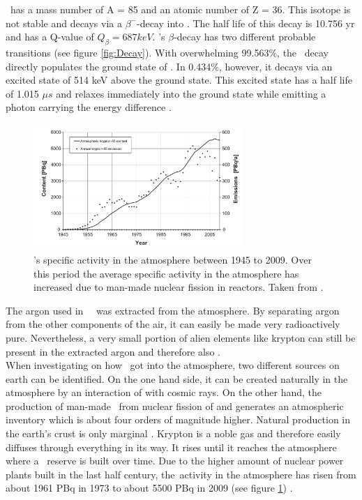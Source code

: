 \documentclass[encoding=utf8,british]{tumphthesis}
\begin{document}
\Kr\ has a mass number of A = 85 and an atomic number of Z = 36.
This isotope is not stable and decays via a $\beta^-$-decay into .
The half life of this decay is 10.756 yr and has a Q-value of $Q_\beta = 687 \unit{keV}$.
\Kr's $\beta$-decay has two different probable transitions (see figure \ref{fig:Decay}).
With overwhelming 99.563$\%$, the \Kr\ decay directly populates the ground state of .
In 0.434$\%$, however, it decays via an excited state of  514 keV above the ground state.
This excited state has a half life of 1.015 $\unit{\mu s}$ and relaxes immediately into the ground state while emitting  a photon carrying the energy difference \cite{singh_nuclear_2014}.
\\

\begin{figure}[t!]
	\centering
	\ifmakefigures%
	\includegraphics[width=80mm]{./Bilder/Kr85Aenderung.png}
	\fi%
	\caption{
	    \Kr's specific activity in the atmosphere between 1945 to 2009. 
	    Over this period the average specific activity in the atmosphere has increased due to man-made nuclear fission in reactors. 
		Taken from \cite{ahlswede_update_2013}.
	}
    \label{fig:Kr85Aenderung}
    
\end{figure}

The argon used in \gerda\ \PII\ was extracted from the atmosphere.
By separating argon from the other components of the air, it can easily be made very radioactively pure.
Nevertheless, a very small portion of alien elements like krypton can still be present in the extracted argon and therefore also \Kr.
\\

When investigating on how  \Kr\ got into the atmosphere, two different sources on earth can be identified.
On the one hand side, it can be created naturally in the atmosphere by an interaction of  with cosmic rays.
On the other hand, the production of man-made \Kr\ from nuclear fission of  and  generates an atmospheric inventory which is about four orders of magnitude higher.
Natural production in the earth's crust is only marginal \cite{winger_new_2005}.
Krypton is a noble gas and therefore easily diffuses through everything in its way.
It rises until it reaches the atmosphere where a \Kr\ reserve is built over time.  
Due to the higher amount of nuclear power plants built in the last half century, the\Kr\ activity in the atmosphere has risen from about 1961 PBq in 1973 \cite{telegadas_atmospheric_1975} to about 5500 PBq in 2009 \cite{ahlswede_update_2013} (see figure \ref{fig:Kr85Aenderung}) .
\\
\end{document}
